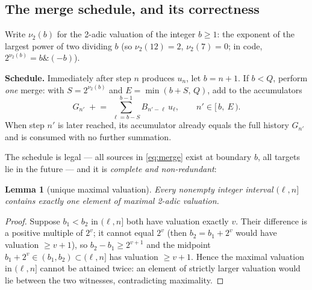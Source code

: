 \documentclass[11pt]{article}
\newtheorem{lemma}{Lemma}
\newcommand{\vtwo}{\nu_2}
\begin{document}
\subsection{The merge schedule, and its correctness}
\label{sec:schedule}

Write $\vtwo(b)$ for the 2-adic valuation of the integer $b\ge1$: the
exponent of the largest power of two dividing $b$ (so $\vtwo(12)=2$,
$\vtwo(7)=0$; in code, $2^{\vtwo(b)} = b \mathbin{\&} (-b)$).

\medskip
\noindent\textbf{Schedule.} Immediately after step $n$ produces $u_n$,
let $b=n+1$. If $b<Q$, perform \emph{one} merge: with
$S = 2^{\vtwo(b)}$ and $E = \min(b+S,\,Q)$, add to the accumulators
\begin{equation}
G_{n'} \;\mathrel{+}=\; \sum_{\ell=b-S}^{b-1} B_{n'-\ell}\,u_\ell,
\qquad n' \in [\,b,\ E\,).
\label{eq:merge}
\end{equation}
When step $n'$ is later reached, its accumulator already equals the
full history $G_{n'}$ and is consumed with no further summation.

\medskip
The schedule is legal --- all sources in \eqref{eq:merge} exist at
boundary $b$, all targets lie in the future --- and it is
\emph{complete and non-redundant}:

\begin{lemma}[unique maximal valuation]
\label{lem:val}
Every nonempty integer interval $(\ell, n]$ contains exactly one
element of maximal 2-adic valuation.
\end{lemma}
\begin{proof}
Suppose $b_1<b_2$ in $(\ell,n]$ both have valuation exactly $v$. Their
difference is a positive multiple of $2^v$; it cannot equal $2^v$ (then
$b_2=b_1+2^v$ would have valuation $\ge v+1$), so $b_2-b_1\ge 2^{v+1}$
and the midpoint $b_1+2^v\in(b_1,b_2)\subset(\ell,n]$ has valuation
$\ge v+1$. Hence the maximal valuation in $(\ell,n]$ cannot be attained
twice: an element of strictly larger valuation would lie between the
two witnesses, contradicting maximality.
\end{proof}
\end{document}
